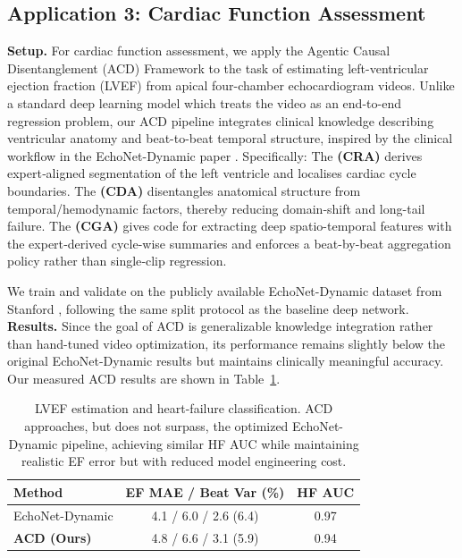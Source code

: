 \documentclass[runningheads]{llncs}
\begin{document}
\subsection{Application 3: Cardiac Function Assessment}
\textbf{Setup.} For cardiac function assessment, we apply the Agentic Causal Disentanglement (ACD) Framework to the task of estimating left-ventricular ejection fraction (LVEF) from apical four-chamber echocardiogram videos. Unlike a standard deep learning model which treats the video as an end-to-end regression problem, our ACD pipeline integrates clinical knowledge describing ventricular anatomy and beat-to-beat temporal structure, inspired by the clinical workflow in the EchoNet-Dynamic paper \cite{ouyang2020echodynamic}. Specifically:
The \textbf{(CRA)} derives expert‐aligned segmentation of the left ventricle and localises cardiac cycle boundaries. The \textbf{(CDA)} disentangles anatomical structure from temporal/hemodynamic factors, thereby reducing domain‐shift and long-tail failure. The \textbf{(CGA)} gives code for extracting deep spatio-temporal features with the expert‐derived cycle-wise summaries and enforces a beat-by-beat aggregation policy rather than single‐clip regression.

We train and validate on the publicly available EchoNet-Dynamic dataset from Stanford \cite{echonetdataset}, following the same split protocol as the baseline deep network.
\textbf{Results.}  
Since the goal of ACD is generalizable knowledge integration rather than hand-tuned video optimization, its performance remains slightly below the original EchoNet-Dynamic results but maintains clinically meaningful accuracy. Our measured ACD results are shown in Table~\ref{tab:cardiac_results}.
\begin{table}[!htbp]
\centering
\footnotesize
\setlength{\tabcolsep}{3pt} %
\caption{LVEF estimation and heart-failure classification. ACD approaches, but does not surpass, the optimized EchoNet-Dynamic pipeline, achieving similar HF AUC while maintaining realistic EF error but with reduced model engineering cost.}
\begin{tabular}{lcc}
\toprule
\textbf{Method} & \textbf{EF MAE / Beat Var (\%)} & \textbf{HF AUC} \\
\midrule
EchoNet-Dynamic & 4.1 / 6.0 / 2.6 (6.4) & 0.97 \\
\textbf{ACD (Ours)} & 4.8 / 6.6 / 3.1 (5.9) & 0.94 \\
\bottomrule
\end{tabular}
\label{tab:cardiac_results}
\end{table}
\end{document}
